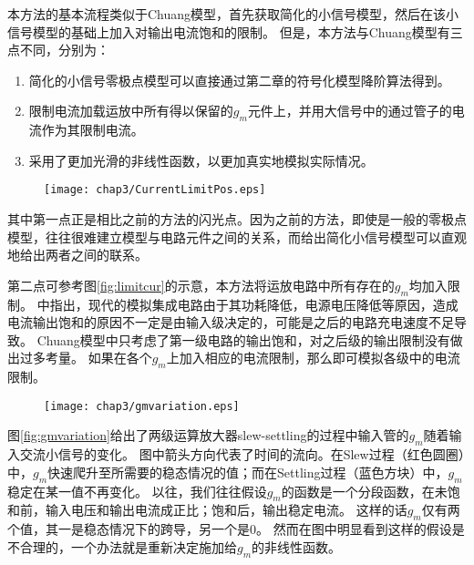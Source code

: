 本方法的基本流程类似于Chuang模型，首先获取简化的小信号模型，然后在该小信号模型的基础上加入对输出电流饱和的限制。
但是，本方法与Chuang模型有三点不同，分别为：

\begin{enumerate}[label=\emph{\alph*})]
	\item 简化的小信号零极点模型可以直接通过第二章的符号化模型降阶算法得到。
	\item 限制电流加载运放中所有得以保留的$g_m$元件上，并用大信号中的通过管子的电流作为其限制电流。
	\item 采用了更加光滑的非线性函数，以更加真实地模拟实际情况。
\end{enumerate}

\begin{figure}[!htp]
	\centering
	\texttt{[image: chap3/CurrentLimitPos.eps]}
\end{figure}

其中第一点正是相比之前的方法的闪光点。因为之前的方法，即使是一般的零极点模型，往往很难建立模型与电路元件之间的关系，而给出简化小信号模型可以直观地给出两者之间的联系。

第二点可参考图\ref{fig:limitcur}的示意，本方法将运放电路中所有存在的$g_m$均加入限制。
\parencite{Yavari-TSSlew-2005}中指出，现代的模拟集成电路由于其功耗降低，电源电压降低等原因，造成电流输出饱和的原因不一定是由输入级决定的，可能是之后的电路充电速度不足导致。
Chuang模型中只考虑了第一级电路的输出饱和，对之后级的输出限制没有做出过多考量。
如果在各个$g_m$上加入相应的电流限制，那么即可模拟各级中的电流限制。

\begin{figure}[!htp]
	\centering
	\texttt{[image: chap3/gmvariation.eps]}
\end{figure}

图\ref{fig:gmvariation}给出了两级运算放大器slew-settling的过程中输入管的$g_m$随着输入交流小信号的变化。
图中箭头方向代表了时间的流向。在Slew过程（红色圆圈）中，$g_m$快速爬升至所需要的稳态情况的值；而在Settling过程（蓝色方块）中，$g_m$稳定在某一值不再变化。
以往，我们往往假设$g_m$的函数是一个分段函数，在未饱和前，输入电压和输出电流成正比；饱和后，输出稳定电流。
这样的话$g_m$仅有两个值，其一是稳态情况下的跨导，另一个是$0$。
然而在图中明显看到这样的假设是不合理的，一个办法就是重新决定施加给$g_m$的非线性函数。


